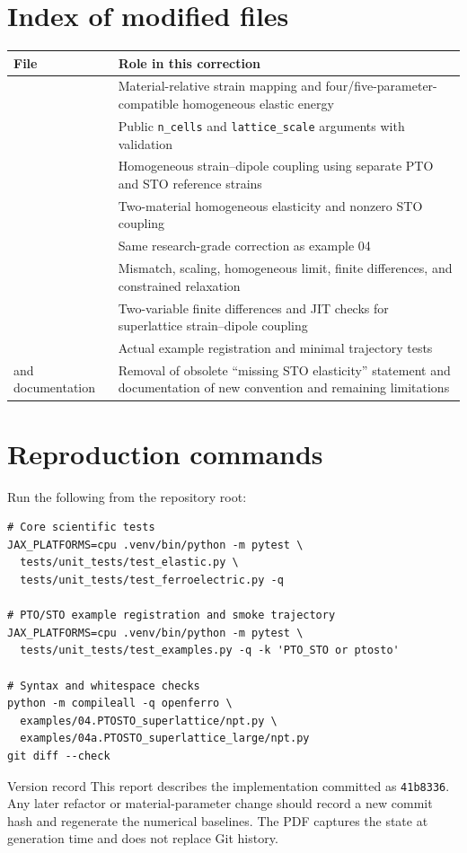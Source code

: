 \documentclass[11pt,a4paper]{article}
\begin{document}
\section{Index of modified files}
\small
\begin{tabularx}{\textwidth}{L{6.0cm}Y}
\toprule
\textbf{File} & \textbf{Role in this correction}\\
\midrule
{} & Material-relative strain mapping and four/five-parameter-compatible homogeneous elastic energy\\
 & Public \texttt{n\_cells} and \texttt{lattice\_scale} arguments with validation\\
 & Homogeneous strain--dipole coupling using separate PTO and STO reference strains\\
 & Two-material homogeneous elasticity and nonzero STO coupling\\
 & Same research-grade correction as example 04\\
 & Mismatch, scaling, homogeneous limit, finite differences, and constrained relaxation\\
 & Two-variable finite differences and JIT checks for superlattice strain--dipole coupling\\
 & Actual example registration and minimal trajectory tests\\
 and documentation & Removal of obsolete ``missing STO elasticity'' statement and documentation of new convention and remaining limitations\\
\bottomrule
\end{tabularx}
\normalsize

\section{Reproduction commands}
Run the following from the  repository root:
\begin{lstlisting}[style=audit]
# Core scientific tests
JAX_PLATFORMS=cpu .venv/bin/python -m pytest \
  tests/unit_tests/test_elastic.py \
  tests/unit_tests/test_ferroelectric.py -q

# PTO/STO example registration and smoke trajectory
JAX_PLATFORMS=cpu .venv/bin/python -m pytest \
  tests/unit_tests/test_examples.py -q -k 'PTO_STO or ptosto'

# Syntax and whitespace checks
python -m compileall -q openferro \
  examples/04.PTOSTO_superlattice/npt.py \
  examples/04a.PTOSTO_superlattice_large/npt.py
git diff --check
\end{lstlisting}

\begin{warnbox}{Version record}
This report describes the implementation committed as \texttt{41b8336}. Any later refactor or material-parameter change should record a new commit hash and regenerate the numerical baselines. The PDF captures the state at generation time and does not replace Git history.
\end{warnbox}
\end{document}
